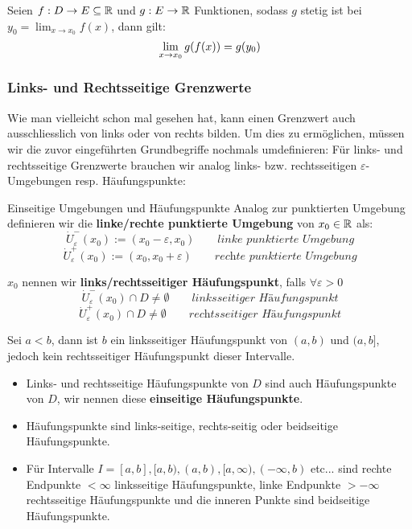 \begin{example}
Seien $f: D \to E \subseteq \mathbb{R}$ und $g: E \to \mathbb{R}$ Funktionen, sodass $g$ stetig ist bei $y_0 = \lim_{x \to x_0} f(x)$, dann gilt:
$$\lim_{x \to x_0}{g(f(x)) = g(y_0)}$$
\end{example}

\subsubsection{Links- und Rechtsseitige Grenzwerte}
Wie man vielleicht schon mal gesehen hat, kann einen Grenzwert auch ausschliesslich von links oder von rechts bilden. Um dies zu ermöglichen, müssen wir die zuvor eingeführten Grundbegriffe nochmals umdefinieren: Für links- und rechtsseitige Grenzwerte brauchen wir analog links- bzw. rechtsseitigen $\varepsilon$-Umgebungen resp. Häufungspunkte:

\begin{definition}{Einseitige Umgebungen und Häufungspunkte}{}
Analog zur punktierten Umgebung definieren wir die \textbf{linke/rechte punktierte Umgebung} von $x_0 \in \mathbb{R}$ als:
$$\dot{U}_\varepsilon^-(x_0) := (x_0-\varepsilon, x_0) \qquad\textit{linke punktierte Umgebung}$$
$$\dot{U}_\varepsilon^+(x_0) := (x_0, x_0+\varepsilon) \qquad\textit{rechte punktierte Umgebung}$$

$x_0$ nennen wir \textbf{links/rechtsseitiger Häufungspunkt}, falls $\forall \varepsilon >0$
$$\dot{U}_\varepsilon^-(x_0) \cap D \ne \emptyset \qquad\textit{linksseitiger Häufungspunkt}$$
$$\dot{U}_\varepsilon^+(x_0) \cap D \ne \emptyset \qquad\textit{rechtsseitiger Häufungspunkt}$$
\end{definition}

\begin{example} Sei $a<b$, dann ist $b$ ein linksseitiger Häufungspunkt von $(a,b)$ und $(a,b]$, jedoch kein rechtsseitiger Häufungspunkt dieser Intervalle.
\end{example}

\begin{remark}
\begin{itemize}
    \item Links- und rechtsseitige Häufungspunkte von $D$ sind auch Häufungspunkte von $D$, wir nennen diese \textbf{einseitige Häufungspunkte}.
    \item Häufungspunkte sind links-seitige, rechts-seitig oder beidseitige Häufungspunkte.
    \item Für Intervalle $I = [a, b], [a, b), (a, b), [a , \infty), (-\infty, b)$ etc... sind rechte Endpunkte $<\infty$ linksseitige Häufungspunkte, linke Endpunkte $>-\infty$ rechtsseitige Häufungspunkte und die inneren Punkte sind beidseitige Häufungspunkte.
\end{itemize}
\end{remark}


